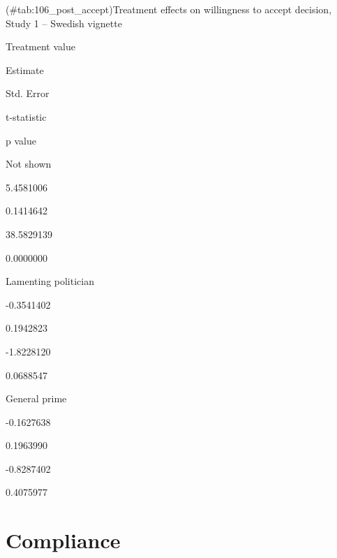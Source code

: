 \documentclass[]{book}
\begin{document}
(\#tab:106\_post\_accept)Treatment effects on willingness to accept
decision, Study 1 -- Swedish vignette

Treatment value

Estimate

Std. Error

t-statistic

p value

Not shown

5.4581006

0.1414642

38.5829139

0.0000000

Lamenting politician

-0.3541402

0.1942823

-1.8228120

0.0688547

General prime

-0.1627638

0.1963990

-0.8287402

0.4075977

\section{Compliance}\label{compliance-2}
\end{document}
